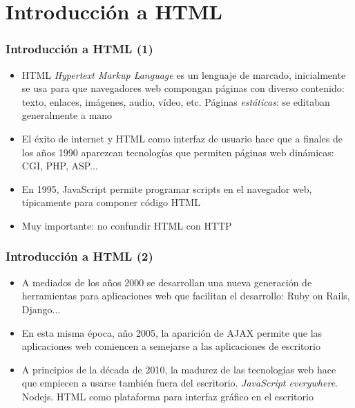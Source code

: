 \documentclass[ucs]{beamer}
\begin{document}
\section{Introducción a HTML}
\begin{frame}[fragile]
\frametitle{Introducción a HTML (1)}
\begin{itemize}
\item
HTML \emph{Hypertext Markup Language} es un lenguaje de marcado, inicialmente se usa para que navegadores web
compongan páginas con diverso contenido: texto, enlaces, imágenes,
audio, vídeo, etc. Páginas \emph{estáticas}: se editaban generalmente a mano

\item
El éxito de internet y HTML como interfaz de usuario hace que 
a finales de los años 1990 aparezcan tecnologías que permiten 
páginas web dinámicas: CGI, PHP, ASP...

\item
En 1995, JavaScript permite programar scripts en el navegador web, típicamente
para componer código HTML

\item
Muy importante: no confundir HTML con HTTP


\end{itemize}
\end{frame}

\begin{frame}[fragile]
\frametitle{Introducción a HTML (2)}
\begin{itemize}
\item
A mediados de los años 2000 se desarrollan una nueva generación de herramientas 
para aplicaciones web que facilitan el desarrollo: Ruby on Rails, Django... 

\item
En esta misma época, año 2005, la aparición de AJAX permite que las aplicaciones
web comiencen a semejarse a las aplicaciones de escritorio

\item
A principios de la década de 2010, la madurez de las tecnologías web hace
que empiecen a usarse también fuera del escritorio. \emph{JavaScript everywhere}.
Nodejs.
HTML como plataforma para interfaz gráfico en el escritorio 


\end{itemize}

\end{frame}
\end{document}
